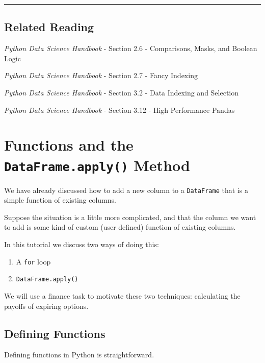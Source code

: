 \documentclass[
  letterpaper,
  DIV=11,
  numbers=noendperiod]{scrreprt}
\begin{document}
\begin{center}\rule{0.5\linewidth}{0.5pt}\end{center}

\hypertarget{related-reading-2}{%
\section{Related Reading}\label{related-reading-2}}

\emph{Python Data Science Handbook} - Section 2.6 - Comparisons, Masks,
and Boolean Logic

\emph{Python Data Science Handbook} - Section 2.7 - Fancy Indexing

\emph{Python Data Science Handbook} - Section 3.2 - Data Indexing and
Selection

\emph{Python Data Science Handbook} - Section 3.12 - High Performance
Pandas

\hypertarget{functions-and-the-dataframe.apply-method}{%
\chapter{\texorpdfstring{Functions and the \texttt{DataFrame.apply()}
Method}{Functions and the DataFrame.apply() Method}}\label{functions-and-the-dataframe.apply-method}}

We have already discussed how to add a new column to a
\texttt{DataFrame} that is a simple function of existing columns.

Suppose the situation is a little more complicated, and that the column
we want to add is some kind of custom (user defined) function of
existing columns.

In this tutorial we discuss two ways of doing this:

\begin{enumerate}
\def\labelenumi{\arabic{enumi}.}
\item
  A \texttt{for} loop
\item
  \texttt{DataFrame.apply()}
\end{enumerate}

We will use a finance task to motivate these two techniques: calculating
the payoffs of expiring options.

\hypertarget{defining-functions}{%
\section{Defining Functions}\label{defining-functions}}

Defining functions in Python is straightforward.
\end{document}
